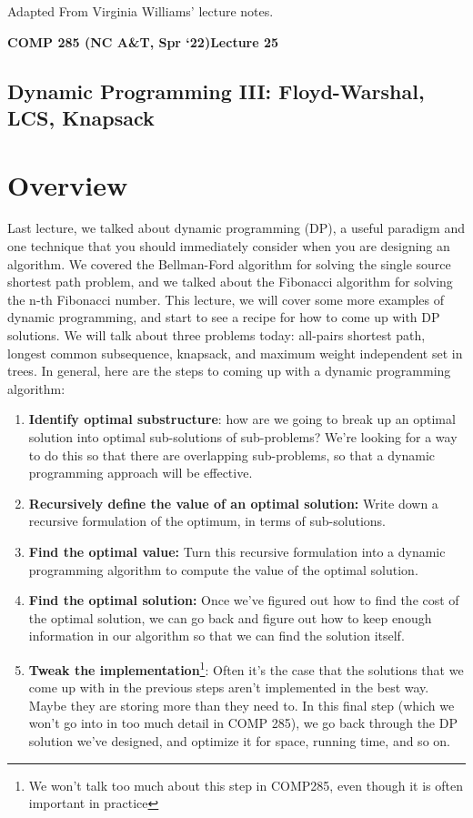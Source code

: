 \documentclass [12pt]{article}
\theoremstyle{definition}
\begin{document}
 

\vspace {1em} 
\begin {Instruction} 
Adapted From Virginia Williams' lecture notes.
\end {Instruction}  

{\LARGE \textbf {COMP 285 (NC A\&T, Spr `22)}\hfill \textbf {Lecture 25} } 

\begin{centering}
\section*{Dynamic Programming III: Floyd-Warshal, LCS, Knapsack}
\end{centering}

\section{Overview}

Last lecture, we talked about dynamic programming (DP), a useful paradigm and one technique that you should immediately consider when you are designing an algorithm. We covered the Bellman-Ford algorithm for solving the single source shortest path problem, and we talked about the Fibonacci algorithm for solving the n-th Fibonacci number. This lecture, we will cover some more examples of dynamic programming, and start to see a recipe for how to come up with DP solutions. We will talk about three problems today: all-pairs shortest path, longest common subsequence, knapsack, and maximum weight independent set in trees. In general, here are the steps to coming up with a dynamic programming algorithm:

\begin{enumerate}
  \item \textbf{Identify optimal substructure}: how are we going to break up an optimal solution into optimal sub-solutions of sub-problems? We're looking for a way to do this so that there are overlapping sub-problems, so that a dynamic programming approach will be effective.
  \item \textbf{Recursively define the value of an optimal solution:} Write down a recursive formulation of the optimum, in terms of sub-solutions.
  \item \textbf{Find the optimal value:} Turn this recursive formulation into a dynamic programming algorithm to compute the value of the optimal solution.
  \item \textbf{Find the optimal solution:} Once we've figured out how to find the cost of the optimal solution, we can go back and figure out how to keep enough information in our algorithm so that we can find the solution itself.
  \item \textbf{Tweak the implementation}\footnote{We won't talk too much about this step in COMP285, even though it is often important in practice}: Often it's the case that the solutions that we come up with in the previous steps aren't implemented in the best way. Maybe they are storing more than they need to. In this final step (which we won't go into in too much detail in COMP 285), we go back through the DP solution we've designed, and optimize it for space, running time, and so on.
\end{enumerate}
\end{document}
